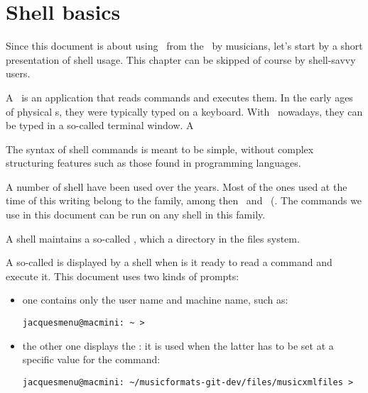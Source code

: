 
\chapter{Shell basics}

Since this document is about using \mf\ from the \CLI\ by musicians, let's start by a short presentation of shell usage. This chapter can be skipped of course by shell-savvy users.

A \shell\ is an application that reads commands and executes them. In the early ages of physical s, they were typically typed on a keyboard. With \GUI\ nowadays, they can be typed in a so-called terminal window.
A 

The syntax of shell commands is meant to be simple, without complex structuring features such as those found in programming languages.

A number of shell have been used over the years. Most of the ones used at the time of this writing belong to the  family, among then \bash\ and \zsh\ (. The commands we use in this document can be run on any shell in this family.

A shell maintains a so-called {\it \currentWorkingDirectory}, which a directory in the files system.

A so-called  is displayed by a shell when is it ready to read a command and execute it. This document uses two kinds of prompts:
\begin{itemize}
\item one contains only the user name and machine name, such as:
\begin{lstlisting}[language=Terminal]
jacquesmenu@macmini: ~ > 
\end{lstlisting}

\item the other one displays the \currentWorkingDirectory: it is used when the latter has to be set at a specific value for the command:
\begin{lstlisting}[language=Terminal]
jacquesmenu@macmini: ~/musicformats-git-dev/files/musicxmlfiles > 
\end{lstlisting}

\end{itemize}



